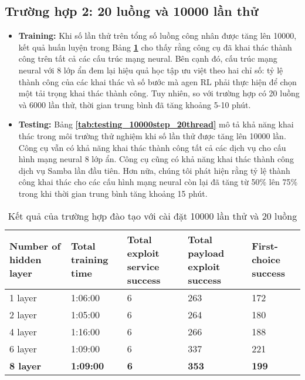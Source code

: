 \subsection{Trường hợp 2: 20 luồng và 10000 lần thử}

\begin{itemize}
    \item \textbf{Training:} Khi số lần thử trên tổng số luồng công nhân được tăng lên 10000, kết quả huấn luyện trong Bảng \textbf{\ref{tab:training_10000step_20thread}} cho thấy rằng công cụ đã khai thác thành công trên tất cả các cấu trúc mạng neural. Bên cạnh đó, cấu trúc mạng neural với 8 lớp ẩn đem lại hiệu quả học tập ưu việt theo hai chỉ số: tỷ lệ thành công của các khai thác và số bước mà agen RL phải thực hiện để chọn một tải trọng khai thác thành công. Tuy nhiên, so với trường hợp có 20 luồng và 6000 lần thử, thời gian trung bình đã tăng khoảng 5-10 phút. 
    \item \textbf{Testing:} Bảng \textbf{\ref{tab:testing_10000step_20thread}} mô tả khả năng khai thác trong môi trường thử nghiệm khi số lần thử được tăng lên 10000 lần. Công cụ vẫn có khả năng khai thác thành công tất cả các dịch vụ cho cấu hình mạng neural 8 lớp ẩn. Công cụ cũng có khả năng khai thác thành công dịch vụ Samba lần đầu tiên. Hơn nữa, chúng tôi phát hiện rằng tỷ lệ thành công khai thác cho các cấu hình mạng neural còn lại đã tăng từ 50\% lên 75\% trong khi thời gian trung bình tăng khoảng 15 phút.
\end{itemize}

 \begin{table}[!h]
    \centering
    \caption{Kết quả của trường hợp đào tạo với cài đặt 10000 lần thử và 20 luồng}
    \label{tab:training_10000step_20thread}
    \begin{tabular}{|p{}| p{}| p{}| p{}| p{}|}
    \hline
    \textbf{Number of hidden layer}&\textbf{Total training time}   &\textbf{Total exploit service success} &\textbf{Total payload exploit success}  &\textbf{First-choice success}  \\ 
    \hline
    1 layer 	&1:06:00	&6	&263	&172	\\ 
    \hline
    2 layer 	&1:05:00	&6	&264	&180	\\ 
    \hline
    4 layer	&1:16:00	&6	&266	&188	\\ 
    \hline
    6 layer 	&1:09:00	&6	&337	&221	\\ 
    \hline
    \textbf{8 layer}	&\textbf{1:09:00}	&\textbf{6}	&\textbf{353}	&\textbf{199}	\\ 
    \hline
    \end{tabular} 
\end{table}



